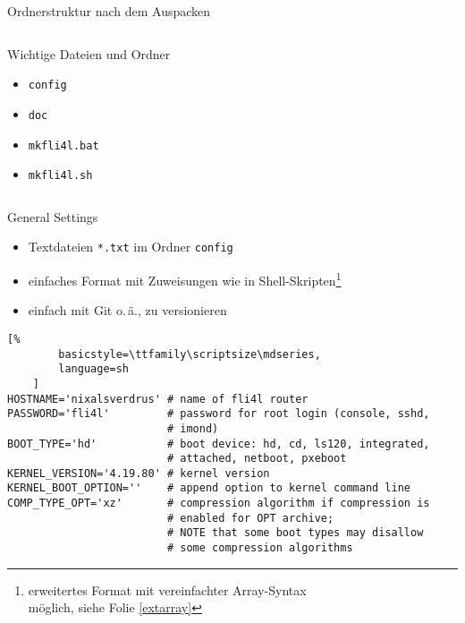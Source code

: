 \documentclass[t]{beamer}
\begin{document}
\begin{frame}{Ordnerstruktur nach dem Auspacken}
    \begin{figure}
    \end{figure}

    \begin{columns}[T,onlytextwidth]
        \begin{column}{0.5\textwidth}
            \begin{block}{Wichtige Dateien und Ordner}
                \begin{itemize}
                    \item \texttt{config}
                    \item \texttt{doc}
                    \item \texttt{mkfli4l.bat}
                    \item \texttt{mkfli4l.sh}
                \end{itemize}
            \end{block}
        \end{column}
        \begin{column}{0.5\textwidth}
            \begin{figure}
            \end{figure}
        \end{column}
    \end{columns}
\end{frame}

\begin{frame}[fragile]{General Settings}
    \begin{itemize}
        \item Textdateien \texttt{*.txt} im Ordner \texttt{config}
        \item einfaches Format mit Zuweisungen wie in
            Shell-Skripten\footnote{erweitertes Format mit vereinfachter
            Array-Syntax\\möglich, siehe Folie \ref{extarray}}
        \item einfach mit Git o.\,ä., zu versionieren
    \end{itemize}

    \begin{lstlisting}[%
        basicstyle=\ttfamily\scriptsize\mdseries,
        language=sh
    ]
HOSTNAME='nixalsverdrus' # name of fli4l router
PASSWORD='fli4l'         # password for root login (console, sshd,
                         # imond)
BOOT_TYPE='hd'           # boot device: hd, cd, ls120, integrated,
                         # attached, netboot, pxeboot
KERNEL_VERSION='4.19.80' # kernel version
KERNEL_BOOT_OPTION=''    # append option to kernel command line
COMP_TYPE_OPT='xz'       # compression algorithm if compression is
                         # enabled for OPT archive;
                         # NOTE that some boot types may disallow
                         # some compression algorithms
    \end{lstlisting}
\end{frame}
\end{document}
